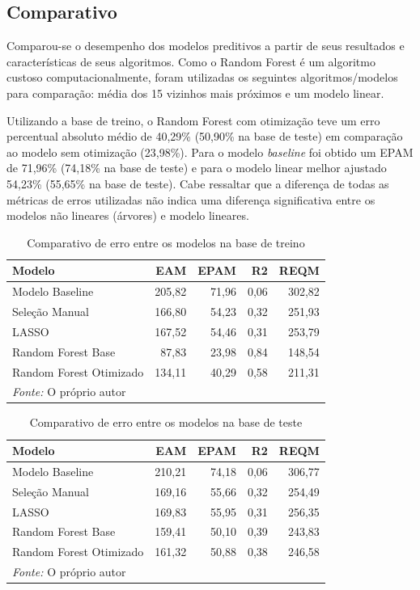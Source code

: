\documentclass[
	12pt,				%
	a4paper,		%
	oneside,    %
	chapter=TITLE,		   %
	section=TITLE,		   %
	subsection=TITLE,	   %
	subsubsection=TITLE, %
	english,			%
	french,				%
	spanish,			%
	brazil,				%
]{abntex2}
\begin{document}
\hypertarget{comparativo}{%
\subsection{Comparativo}\label{comparativo}}

Comparou-se o desempenho dos modelos preditivos a partir de seus
resultados e características de seus algoritmos. Como o Random Forest é
um algoritmo custoso computacionalmente, foram utilizadas os seguintes
algoritmos/modelos para comparação: média dos 15 vizinhos mais próximos
e um modelo linear.

Utilizando a base de treino, o Random Forest com otimização teve um erro
percentual absoluto médio de 40,29\% (50,90\% na base de teste) em
comparação ao modelo sem otimização (23,98\%). Para o modelo
\emph{baseline} foi obtido um EPAM de 71,96\% (74,18\% na base de teste)
e para o modelo linear melhor ajustado 54,23\% (55,65\% na base de
teste). Cabe ressaltar que a diferença de todas as métricas de erros
utilizadas não indica uma diferença significativa entre os modelos não
lineares (árvores) e modelo lineares.

\begin{table}

\caption{\label{tab:comp_erro}Comparativo de erro entre os modelos na base de treino}
\centering
\begin{tabular}[t]{l|r|r|r|r}
\hline
Modelo & EAM & EPAM & R2 & REQM\\
\hline
Modelo Baseline & 205,82 & 71,96 & 0,06 & 302,82\\
\hline
Seleção Manual & 166,80 & 54,23 & 0,32 & 251,93\\
\hline
LASSO & 167,52 & 54,46 & 0,31 & 253,79\\
\hline
Random Forest Base & 87,83 & 23,98 & 0,84 & 148,54\\
\hline
Random Forest Otimizado & 134,11 & 40,29 & 0,58 & 211,31\\
\hline
\multicolumn{5}{l}{\textit{Fonte: } O próprio autor}\\
\end{tabular}
\end{table}

\begin{table}

\caption{\label{tab:comp_erro_teste}Comparativo de erro entre os modelos na base de teste}
\centering
\begin{tabular}[t]{l|r|r|r|r}
\hline
Modelo & EAM & EPAM & R2 & REQM\\
\hline
Modelo Baseline & 210,21 & 74,18 & 0,06 & 306,77\\
\hline
Seleção Manual & 169,16 & 55,66 & 0,32 & 254,49\\
\hline
LASSO & 169,83 & 55,95 & 0,31 & 256,35\\
\hline
Random Forest Base & 159,41 & 50,10 & 0,39 & 243,83\\
\hline
Random Forest Otimizado & 161,32 & 50,88 & 0,38 & 246,58\\
\hline
\multicolumn{5}{l}{\textit{Fonte: } O próprio autor}\\
\end{tabular}
\end{table}
\end{document}
